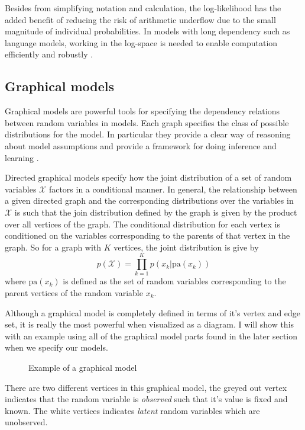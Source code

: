 Besides from simplifying notation and calculation, the log-likelihood has the added benefit of
reducing the risk of arithmetic underflow due to the small magnitude of
individual probabilities. In models with long dependency such as language
models, working in the log-space is needed to enable computation efficiently and
robustly \cite{}.

\subsection{Graphical models}
Graphical models are powerful tools for specifying the dependency relations
between random variables in models. Each graph specifies the class of possible distributions for the model. In particular they provide a clear way
of reasoning about model assumptions and provide a framework for doing inference
and learning \cite{Barber:2012:BRM:2207809}.

Directed graphical models specify how the joint distribution of a set of random
variables $\mathcal{X}$ factors in a conditional manner. In general, the
relationship between a given directed graph and the corresponding distributions
over the variables in $\mathcal{X}$ is such that the join distribution defined
by the graph is given by the product over all vertices of the graph. The
conditional distribution for each vertex is conditioned on the variables
corresponding to the parents of that vertex in the graph. So for a graph with
$K$ vertices, the joint distribution is give by
\begin{equation}
  \label{eq:dir_graph_model_dist}
  p(\mathcal{X}) = \prod_{k=1}^K p(x_k | \text{pa}(x_k))
\end{equation}
where $\text{pa}(x_k)$ is defined as the set of random variables corresponding
to the parent vertices of the random variable $x_k$.

Although a graphical model is completely defined in terms of it's vertex and
edge set, it is really the most powerful when visualized as a diagram. I will
show this with an example using all of the graphical model parts found in the
later section when we specify our models.
\begin{figure}[H]
  \center
  \label{tikz:gm}
  \caption{Example of a graphical model}
\end{figure}
There are two different vertices in this graphical model, the greyed out vertex
indicates that the random variable is \textit{observed} such that it's value is
fixed and known. The white vertices indicates \textit{latent} random variables which are unobserved.

